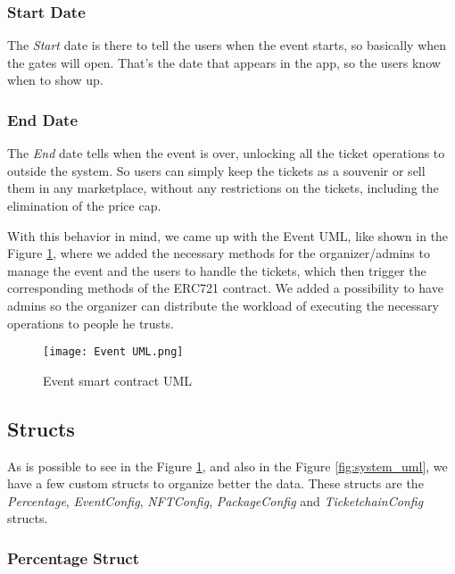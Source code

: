 \subsubsection{Start Date}

The \textit{Start} date is there to tell the users when the event starts, so basically when the gates will open. That's the date that appears in the app, so the users know when to show up.

\subsubsection{End Date}

The \textit{End} date tells when the event is over, unlocking all the ticket operations to outside the system. So users can simply keep the tickets as a souvenir or sell them in any marketplace, without any restrictions on the tickets, including the elimination of the price cap.

With this behavior in mind, we came up with the Event UML, like shown in the Figure \ref{fig:event_uml}, where we added the necessary methods for the organizer/admins to manage the event and the users to handle the tickets, which then trigger the corresponding methods of the ERC721 contract. We added a possibility to have admins so the organizer can distribute the workload of executing the necessary operations to people he trusts.

\begin{figure}[H]
    \texttt{[image: Event UML.png]}
    \centering
    \caption{Event smart contract UML}
    \label{fig:event_uml}
\end{figure}

\subsection{Structs}
\label{subsec:structs}

As is possible to see in the Figure \ref{fig:event_uml}, and also in the Figure \ref{fig:system_uml}, we have a few custom structs to organize better the data. These structs are the \textit{Percentage}, \textit{EventConfig}, \textit{NFTConfig}, \textit{PackageConfig} and \textit{TicketchainConfig} structs.

\subsubsection{Percentage Struct}


